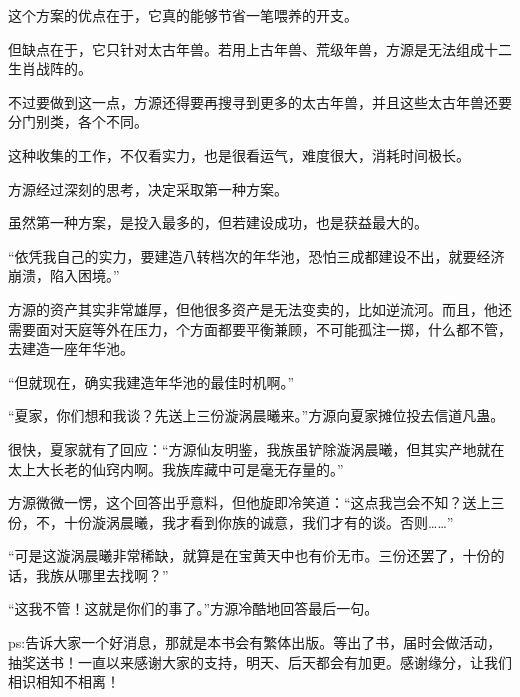 \begin{this_body}
这个方案的优点在于，它真的能够节省一笔喂养的开支。

但缺点在于，它只针对太古年兽。若用上古年兽、荒级年兽，方源是无法组成十二生肖战阵的。

不过要做到这一点，方源还得要再搜寻到更多的太古年兽，并且这些太古年兽还要分门别类，各个不同。

这种收集的工作，不仅看实力，也是很看运气，难度很大，消耗时间极长。

方源经过深刻的思考，决定采取第一种方案。

虽然第一种方案，是投入最多的，但若建设成功，也是获益最大的。

“依凭我自己的实力，要建造八转档次的年华池，恐怕三成都建设不出，就要经济崩溃，陷入困境。”

方源的资产其实非常雄厚，但他很多资产是无法变卖的，比如逆流河。而且，他还需要面对天庭等外在压力，个方面都要平衡兼顾，不可能孤注一掷，什么都不管，去建造一座年华池。

“但就现在，确实我建造年华池的最佳时机啊。”

“夏家，你们想和我谈？先送上三份漩涡晨曦来。”方源向夏家摊位投去信道凡蛊。

很快，夏家就有了回应：“方源仙友明鉴，我族虽铲除漩涡晨曦，但其实产地就在太上大长老的仙窍内啊。我族库藏中可是毫无存量的。”

方源微微一愣，这个回答出乎意料，但他旋即冷笑道：“这点我岂会不知？送上三份，不，十份漩涡晨曦，我才看到你族的诚意，我们才有的谈。否则……”

“可是这漩涡晨曦非常稀缺，就算是在宝黄天中也有价无市。三份还罢了，十份的话，我族从哪里去找啊？”

“这我不管！这就是你们的事了。”方源冷酷地回答最后一句。

ps:告诉大家一个好消息，那就是本书会有繁体出版。等出了书，届时会做活动，抽奖送书！一直以来感谢大家的支持，明天、后天都会有加更。感谢缘分，让我们相识相知不相离！

\end{this_body}

